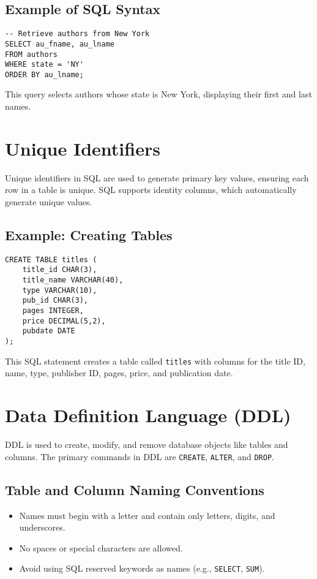 \documentclass{article}
\begin{document}
\subsection{Example of SQL Syntax}
\begin{verbatim}
-- Retrieve authors from New York
SELECT au_fname, au_lname
FROM authors
WHERE state = 'NY'
ORDER BY au_lname;
\end{verbatim}

This query selects authors whose state is New York, displaying their first and last names.

\section{Unique Identifiers}
Unique identifiers in SQL are used to generate primary key values, ensuring each row in a table is unique. SQL supports identity columns, which automatically generate unique values.

\subsection{Example: Creating Tables}
\begin{verbatim}
CREATE TABLE titles (
    title_id CHAR(3),
    title_name VARCHAR(40),
    type VARCHAR(10),
    pub_id CHAR(3),
    pages INTEGER,
    price DECIMAL(5,2),
    pubdate DATE
);
\end{verbatim}

This SQL statement creates a table called \texttt{titles} with columns for the title ID, name, type, publisher ID, pages, price, and publication date.

\section{Data Definition Language (DDL)}
DDL is used to create, modify, and remove database objects like tables and columns. The primary commands in DDL are \texttt{CREATE}, \texttt{ALTER}, and \texttt{DROP}.

\subsection{Table and Column Naming Conventions}
\begin{itemize}
    \item Names must begin with a letter and contain only letters, digits, and underscores.
    \item No spaces or special characters are allowed.
    \item Avoid using SQL reserved keywords as names (e.g., \texttt{SELECT}, \texttt{SUM}).
\end{itemize}
\end{document}
